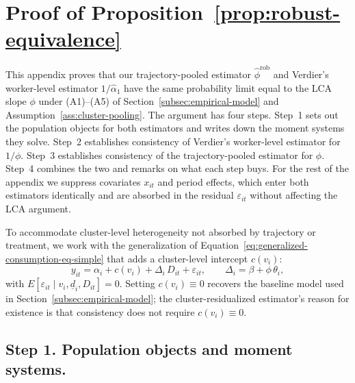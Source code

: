 %

\section{Proof of Proposition~\ref{prop:robust-equivalence}}\label{app:robust-equivalence}

This appendix proves that our trajectory-pooled estimator $\hat\phi^{\mathrm{rob}}$ and Verdier's worker-level estimator $1/\hat\alpha_1$ have the same probability limit equal to the LCA slope $\phi$ under (A1)--(A5) of Section~\ref{subsec:empirical-model} and Assumption~\ref{ass:cluster-pooling}.
The argument has four steps.
Step~1 sets out the population objects for both estimators and writes down the moment systems they solve.
Step~2 establishes consistency of Verdier's worker-level estimator for $1/\phi$.
Step~3 establishes consistency of the trajectory-pooled estimator for $\phi$.
Step~4 combines the two and remarks on what each step buys.
For the rest of the appendix we suppress covariates $x_{it}$ and period effects, which enter both estimators identically and are absorbed in the residual $\varepsilon_{it}$ without affecting the LCA argument.

To accommodate cluster-level heterogeneity not absorbed by trajectory or treatment, we work with the generalization of Equation~\eqref{eq:generalized-consumption-eq-simple} that adds a cluster-level intercept $c(v_i)$:
\begin{equation}\label{eq:generalized-with-cluster}
y_{it} = \alpha_i + c(v_i) + \Delta_i\, D_{it} + \varepsilon_{it},
\qquad \Delta_i = \beta + \phi\,\theta_i,
\end{equation}
with $E[\varepsilon_{it}\mid v_i,\underline d_i,D_{it}] = 0$.
Setting $c(v_i) \equiv 0$ recovers the baseline model used in Section~\ref{subsec:empirical-model}; the cluster-residualized estimator's reason for existence is that consistency does not require $c(v_i) \equiv 0$.

\subsection*{Step 1.  Population objects and moment systems.}

